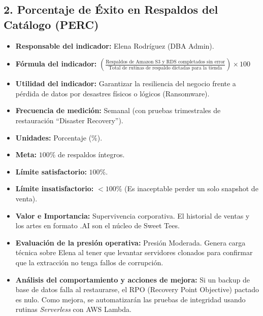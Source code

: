\documentclass[11pt,a4paper]{article}
\begin{document}
\subsection{2. Porcentaje de Éxito en Respaldos del Catálogo (PERC)}
\begin{itemize}[label={--}, itemsep=0.1cm]
    \item \textbf{Responsable del indicador:} Elena Rodríguez (DBA Admin).
    \item \textbf{Fórmula del indicador:} $\left(\frac{\text{Respaldos de Amazon S3 y RDS completados sin error}}{\text{Total de rutinas de respaldo dictadas para la tienda}}\right) \times 100$
    \item \textbf{Utilidad del indicador:} Garantizar la resiliencia del negocio frente a pérdida de datos por desastres físicos o lógicos (Ransomware).
    \item \textbf{Frecuencia de medición:} Semanal (con pruebas trimestrales de restauración \enquote{Disaster Recovery}).
    \item \textbf{Unidades:} Porcentaje (\%).
    \item \textbf{Meta:} $100\%$ de respaldos íntegros.
    \item \textbf{Límite satisfactorio:} $100\%$.
    \item \textbf{Límite insatisfactorio:} $< 100\%$ (Es inaceptable perder un solo snapshot de venta).
    \item \textbf{Valor e Importancia:} Supervivencia corporativa. El historial de ventas y los artes en formato .AI son el núcleo de Sweet Tees.
    \item \textbf{Evaluación de la presión operativa:} Presión Moderada. Genera carga técnica sobre Elena al tener que levantar servidores clonados para confirmar que la extracción no tenga fallos de corrupción.
    \item \textbf{Análisis del comportamiento y acciones de mejora:} Si un backup de base de datos falla al restaurarse, el RPO (Recovery Point Objective) pactado es nulo. Como mejora, se automatizarán las pruebas de integridad usando rutinas \textit{Serverless} con AWS Lambda.
\end{itemize}
\end{document}
